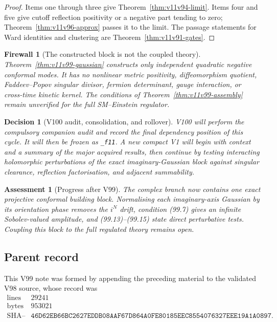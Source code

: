 \documentclass[11pt]{article}
\newtheorem{assessment}[theorem]{Assessment}
\newtheorem{firewall}[theorem]{Firewall}
\newtheorem{decision}[theorem]{Decision}
\begin{document}
\begin{proof}
Items one through three give Theorem~\ref{thm:v11v94-limit}.
Items four and five give cutoff reflection positivity or a negative
part tending to zero; Theorem~\ref{thm:v11v96-approx} passes it to the
limit.  The passage statements for Ward identities and clustering are
Theorem~\ref{thm:v11v91-gates}.
\end{proof}

\begin{firewall}[The constructed block is not the coupled theory]
\label{fire:v11v99-boundary}
Theorem~\ref{thm:v11v99-gaussian} constructs only independent
quadratic negative conformal modes.  It has no nonlinear metric
positivity, diffeomorphism quotient, Faddeev--Popov singular divisor,
fermion determinant, gauge interaction, or cross-time kinetic
kernel.  The conditions of
Theorem~\ref{thm:v11v99-assembly} remain unverified for the full
SM--Einstein regulator.
\end{firewall}

\begin{decision}[V100 audit, consolidation, and rollover]
\label{dec:v11v99-next}
V100 will perform the compulsory companion audit and record the final
dependency position of this cycle.  It will then be frozen as
\texttt{\_f11}.  A new compact V1 will begin with context and a summary
of the major acquired results, then continue by testing interacting
holomorphic perturbations of the exact imaginary-Gaussian block
against singular clearance, reflection factorisation, and adjacent
summability.
\end{decision}

\begin{assessment}[Progress after V99]
\label{ass:v11v99-status}
The complex branch now contains one exact projective conformal
building block.  Normalising each imaginary-axis Gaussian by its
orientation phase removes the \(i^N\) drift, condition (99.7) gives
an infinite Sobolev-valued amplitude, and (99.13)--(99.15) state
direct perturbative tests.  Coupling this block to the full regulated
theory remains open.
\end{assessment}

\subsection{Parent record}

This V99 note was formed by appending the preceding material to the
validated V98 source, whose record was
\[
\begin{array}{c|c}
\text{lines}&29241\\
\text{bytes}&953021\\
\text{SHA--256}&
\texttt{46D62EB66BC2627EDDB08AAF67D864A0FE80185EEC8554076327EEE19A1A0897}.
\end{array}                                                     \tag{99.16}
\]
\end{document}
